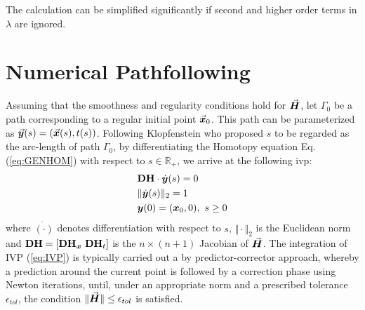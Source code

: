 \begin{appendices}
The calculation can be simplified significantly if second and higher order 
terms in $\lambda$ are ignored.

\chapter{Numerical Pathfollowing}\label{appendix:APPENDIX_E}

Assuming that the smoothness and regularity conditions hold for $\vec{\bm{H}}$, let
$\mathit{\Gamma}_0$ be a path corresponding to a regular initial point
$\vec{\bm{x}}_0$. This path can be parameterized as
$\vec{\bm{y}}(s)=(\vec{\bm{x}}(s),t(s))$. Following Klopfenstein\cite{Klopfenstein:1961}
who proposed $s$ to be regarded as the arc-length of path
$\mathit{\Gamma}_0$,
by differentiating the Homotopy equation Eq.
(\ref{eq:GENHOM})  with respect to $s\in\mathbb{R}_+$, we arrive at the 
following \acrshort{ivp}:
\begin{subequations}
	\begin{align}
		&\mathbf{DH}\cdot \dot{\bm{y}}(s) = 0\label{eq:IVP1_APP}\\
		&\Vert \dot{\bm{y}}(s)\Vert_2 = 1\label{eq:IVP2_AA}\\
		&\bm{y}(0) = (\bm{x}_0,0),\ s\geq 0\nonumber
	\end{align}
	\label{eq:IVP_APP}
\end{subequations}
\noindent where $\dot{(\cdot)}$ denotes differentiation with 
respect to $s$,  $\Vert \cdot\Vert_2$ is the Euclidean norm and
$\mathbf{DH}=[\mathbf{DH}_{\bm{x}}\ \mathbf{DH}_t]$ is the $n\times (n+1)$ 
Jacobian of $\vec{\bm{H}}$.
The integration of IVP (\ref{eq:IVP}) is typically carried out a by 
predictor-corrector approach, whereby a prediction around the current point 
is followed by a correction phase using Newton iterations, until, under an
appropriate norm and a prescribed tolerance $\epsilon_{tol}$, the condition
$\Vert \vec{\bm{H}}\Vert\leq \epsilon_{tol}$ is satisfied. 


\end{appendices}
